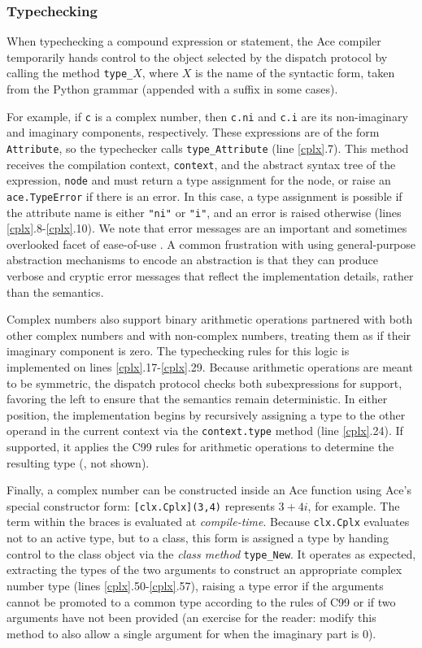 \documentclass[9pt,preprint]{sigplanconf}
\begin{document}
\subsubsection{Typechecking}
When typechecking a compound expression or statement, the Ace compiler temporarily hands control to the object selected by the dispatch protocol by calling the method \verb|type_|$X$, where $X$ is  the name of the syntactic form, taken from the Python grammar \cite{pythonast} (appended with a suffix in some cases). 

For example, if \verb|c| is a complex number, then \verb|c.ni| and \verb|c.i| are its non-imaginary and imaginary components, respectively. These expressions are of the form \verb|Attribute|, so the typechecker calls \verb|type_Attribute| (line \ref{cplx}.7).
This method receives the compilation context, \verb|context|, and the abstract syntax tree of the expression, \verb|node| and must return a type assignment for the node, or raise an \verb|ace.TypeError| if there is an error. In this case, a type assignment is possible if the attribute name is either \verb|"ni"| or \verb|"i"|, and an error is raised otherwise (lines \ref{cplx}.8-\ref{cplx}.10). We note that error messages are an important and sometimes overlooked facet of {ease-of-use} \cite{marceau2011measuring}. A common frustration with using general-purpose abstraction mechanisms to encode an abstraction is that they can produce  verbose and cryptic error messages that reflect the implementation details, rather than the semantics. %

Complex numbers also support binary arithmetic operations partnered with both other complex numbers and with non-complex numbers, treating them as if their imaginary component is zero. The typechecking rules for this logic is implemented on lines \ref{cplx}.17-\ref{cplx}.29. Because arithmetic operations are meant to be symmetric, the dispatch protocol checks both subexpressions for support, favoring the left to ensure that the semantics remain deterministic. In either position, the implementation begins by recursively assigning a type to the other operand in the current context via the \verb|context.type| method (line \ref{cplx}.24). If supported, it applies the C99 rules for arithmetic operations to determine the resulting type (\cite{c99}, not shown). 

Finally, a complex number can be constructed inside an Ace function using Ace's special constructor form: \verb|[clx.Cplx](3,4)| represents $3+4i$, for example. The term within the braces is evaluated at \emph{compile-time}. Because \verb|clx.Cplx| evaluates not to an active type, but to a class, this form is assigned a type by handing control to the class object via the \emph{class method} \verb|type_New|. It operates as expected, extracting the types of the two arguments to construct an appropriate complex number type (lines \ref{cplx}.50-\ref{cplx}.57), raising a type error if the arguments cannot be promoted to a common type according to the rules of C99 or if two arguments have not been provided (an exercise for the reader: modify this method to also allow a single argument for when the imaginary part is 0). 
\end{document}
